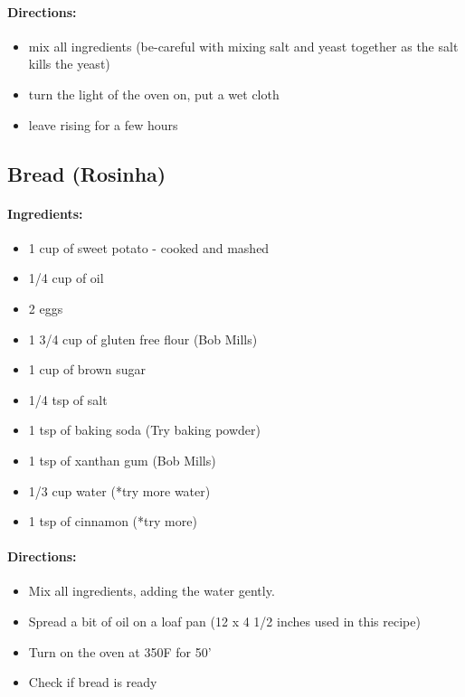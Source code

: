 \documentclass{article}
\begin{document}
\paragraph{Directions:}
\begin{itemize}
    \item mix all ingredients (be-careful with mixing salt and yeast together as the salt kills the yeast)
    \item turn the light of the oven on, put a wet cloth
    \item leave rising for a few hours
\end{itemize}

\subsection{Bread (Rosinha)}

\paragraph{Ingredients:}
\begin{itemize}
    \item 1 cup of sweet potato - cooked and mashed
    \item 1/4 cup of oil
    \item 2 eggs
    \item 1 3/4 cup of gluten free flour (Bob Mills)
    \item 1 cup of brown sugar
    \item 1/4 tsp of salt
    \item 1 tsp of baking soda (Try baking powder)
    \item 1 tsp of xanthan gum (Bob Mills)
    \item 1/3 cup water (*try more water)
    \item 1 tsp of cinnamon (*try more)
\end{itemize}

\paragraph{Directions:}
\begin{itemize}
    \item Mix all ingredients, adding the water gently.
    \item Spread a bit of oil on a loaf pan (12 x 4 1/2 inches used in this recipe)
    \item Turn on the oven at 350F for 50'
    \item Check if bread is ready
\end{itemize}
\end{document}
